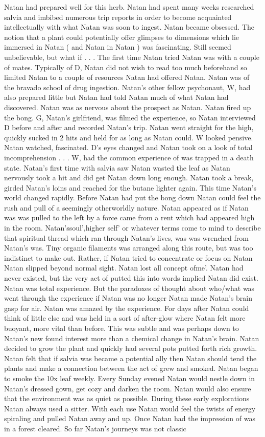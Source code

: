 \documentclass[12pt]{book}
\begin{document}
Natan had prepared well for this herb. Natan had spent many weeks researched salvia and imbibed numerous trip reports in order to become acquainted intellectually with what Natan was soon to ingest. Natan became obsessed. The notion that a plant could potentially offer glimpses to dimensions which lie immersed in Natan ( and Natan in Natan ) was fascinating. Still seemed unbelievable, but what if . . .  The first time Natan tried Natan was with a couple of mates. Typically of D, Natan did not wish to read too much beforehand so limited Natan to a couple of resources Natan had offered Natan. Natan was of the bravado school of drug ingestion. Natan's other fellow psychonaut, W, had also prepared little but Natan had told Natan much of what Natan had discovered. Natan was as nervous about the prospect as Natan. Natan fired up the bong. G, Natan's girlfriend, was filmed the experience, so Natan interviewed D before and after and recorded Natan's trip. Natan went straight for the high, quickly sucked in 2 hits and held for as long as Natan could. W looked pensive. Natan watched, fascinated. D's eyes changed and Natan took on a look of total incomprehension . . .  W, had the common experience of was trapped in a death state. Natan's first time with salvia saw Natan wasted the leaf as Natan nervously took a hit and did get Natan down long enough. Natan took a break, girded Natan's loins and reached for the butane lighter again. This time Natan's world changed rapidly. Before Natan had put the bong down Natan could feel the rush and pull of a seemingly otherworldly nature. Natan appeared as if Natan was was pulled to the left by a force came from a rent which had appeared high in the room. Natan'ssoul',higher self' or whatever terms come to mind to describe that spiritual thread which ran through Natan's lives, was was wrenched from Natan's was. Tiny organic filaments was arranged along this route, but was too indistinct to make out. Rather, if Natan tried to concentrate or focus on Natan Natan slipped beyond normal sight. Natan lost all concept ofme'. Natan had never existed, but the very act of putted this into words implied Natan did exist. Natan was total experience. But the paradoxes of thought about who/what was went through the experience if Natan was no longer Natan made Natan's brain gasp for air. Natan was amazed by the experience. For days after Natan could think of little else and was held in a sort of after-glow where Natan felt more buoyant, more vital than before. This was subtle and was perhaps down to Natan's new found interest more than a chemical change in Natan's brain. Natan decided to grow the plant and quickly had several pots putted forth rich growth. Natan felt that if salvia was became a potential ally then Natan should tend the plants and make a connection between the act of grew and smoked. Natan began to smoke the 10x leaf weekly. Every Sunday evened Natan would nestle down in Natan's dressed gown, get cozy and darken the room. Natan would also ensure that the environment was as quiet as possible. During these early explorations Natan always used a sitter. With each use Natan would feel the twists of energy spiraling and pulled Natan away and up. Once Natan had the impression of was in a forest cleared. So far Natan's journeys was not classic 
\end{document}
